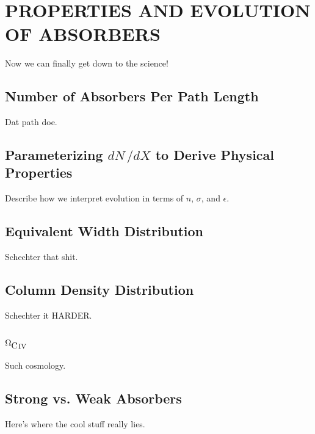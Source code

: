 \section{\MakeUppercase{Properties and Evolution of {\CIV} Absorbers}}
\label{ch6}

Now we can finally get down to the science!

\subsection{Number of Absorbers Per Path Length}
\label{ch6:dndx}

Dat path doe.

\subsection{Parameterizing $dN\,/dX$ to Derive Physical Properties}
\label{ch6:parameterize}

Describe how we interpret evolution in terms of $n$, $\sigma$, and $\epsilon$.

\subsection{Equivalent Width Distribution}
\label{ch6:ewdistro}

Schechter that shit.

\subsection{Column Density Distribution}
\label{ch6:columndistro}

Schechter it HARDER.

\subsection{$\Omega_{\hbox{{\rm C}\kern 0.1em{\sc iv}}}$}
\label{ch6:omega}

Such cosmology.

\subsection{Strong vs. Weak Absorbers}
\label{ch6:strongweak}

Here's where the cool stuff really lies.
